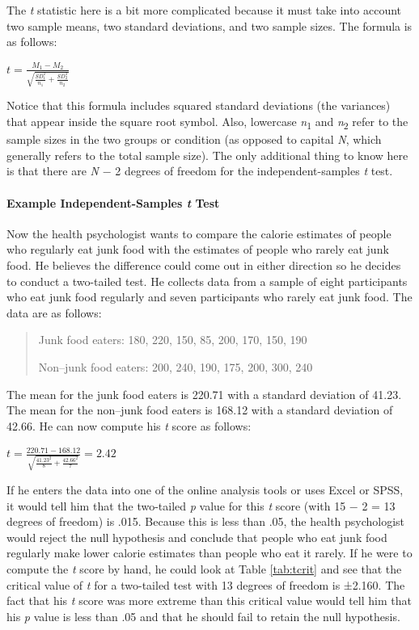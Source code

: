 \documentclass[
]{krantz}
\begin{document}
The \emph{t} statistic here is a bit more complicated because it must take into account two sample means, two standard deviations, and two sample sizes. The formula is as follows:

\(t=\frac{M_1-M_2}{\sqrt{\frac{SD_1^2}{n_1}+\frac{SD_2^2}{n_2}}}\)

Notice that this formula includes squared standard deviations (the variances) that appear inside the square root symbol. Also, lowercase \emph{n}\textsubscript{1} and \emph{n}\textsubscript{2} refer to the sample sizes in the two groups or condition (as opposed to capital \emph{N}, which generally refers to the total sample size). The only additional thing to know here is that there are \emph{N} − 2 degrees of freedom for the independent-samples \emph{t} test.

\hypertarget{example-independent-samples-t-test}{%
\paragraph*{\texorpdfstring{Example Independent-Samples \emph{t} Test}{Example Independent-Samples t Test}}\label{example-independent-samples-t-test}}

Now the health psychologist wants to compare the calorie estimates of people who regularly eat junk food with the estimates of people who rarely eat junk food. He believes the difference could come out in either direction so he decides to conduct a two-tailed test. He collects data from a sample of eight participants who eat junk food regularly and seven participants who rarely eat junk food. The data are as follows:

\begin{quote}
Junk food eaters: 180, 220, 150, 85, 200, 170, 150, 190

Non--junk food eaters: 200, 240, 190, 175, 200, 300, 240
\end{quote}

The mean for the junk food eaters is 220.71 with a standard deviation of 41.23. The mean for the non--junk food eaters is 168.12 with a standard deviation of 42.66. He can now compute his \emph{t} score as follows:

\(t=\frac{220.71-168.12}{\sqrt{\frac{41.23^2}{8}+\frac{42.66^2}{7}}}=2.42\)

If he enters the data into one of the online analysis tools or uses Excel or SPSS, it would tell him that the two-tailed \emph{p} value for this \emph{t} score (with 15 − 2 = 13 degrees of freedom) is .015. Because this is less than .05, the health psychologist would reject the null hypothesis and conclude that people who eat junk food regularly make lower calorie estimates than people who eat it rarely. If he were to compute the \emph{t} score by hand, he could look at Table \ref{tab:tcrit} and see that the critical value of \emph{t} for a two-tailed test with 13 degrees of freedom is ±2.160. The fact that his \emph{t} score was more extreme than this critical value would tell him that his \emph{p} value is less than .05 and that he should fail to retain the null hypothesis.
\end{document}
